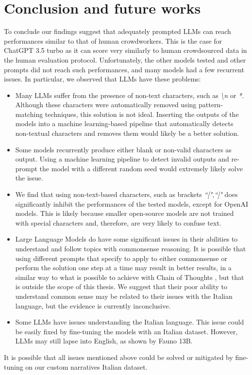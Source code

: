 \chapter{Conclusion and future works}
\label{cha:conclusion}
To conclude our findings suggest that adequately prompted LLMs can reach performances similar to that of human crowdworkers. This is the case for ChatGPT 3.5 turbo as it can score very similarly to human crowdsourced data in the human evaluation protocol.
Unfortunately, the other models tested and other prompts did not reach such performances, and many models had a few recurrent issues. In particular, we observed that LLMs have these problems:
\begin{itemize}
    \item Many LLMs suffer from the presence of non-text characters, such as \emph{\textbackslash n} or \emph{*}. Although these characters were automatically removed using pattern-matching techniques, this solution is not ideal. Inserting the outputs of the models into a machine learning-based pipeline that automatically detects non-textual characters and removes them would likely be a better solution.
    \item Some models recurrently produce either blank or non-valid characters as output. Using a machine learning pipeline to detect invalid outputs and re-prompt the model with a different random seed would extremely likely solve the issue.
    \item We find that using non-text-based characters, such as brackets \emph{``["},\emph{``]"} does significantly inhibit the performances of the tested models, except for OpenAI models. This is likely because smaller open-source models are not trained with special characters and, therefore, are very likely to confuse text.
    \item Large Language Models do have some significant issues in their abilities to understand and follow topics with commonsense reasoning. It is possible that using different prompts that specify to apply to either commonsense or perform the solution one step at a time may result in better results, in a similar way to what is possible to achieve with Chain of Thoughts \cite{wei2023chainofthought}, but that is outside the scope of this thesis. We suggest that their poor ability to understand common sense may be related to their issues with the Italian language, but the evidence is currently inconclusive.
    \item Some LLMs have issues understanding the Italian language. This issue could be easily fixed by fine-tuning the models with an Italian dataset. However, LLMs may still lapse into English, as shown by Fauno 13B.
\end{itemize}
It is possible that all issues mentioned above could be solved or mitigated by fine-tuning on our custom narratives Italian dataset.

